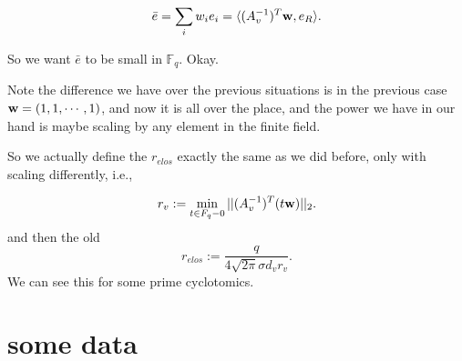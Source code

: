 \documentclass{amsart}
\begin{document}
\[
    \bar{e} = \sum_i w_ie_i =  \langle (A_v^{-1})^T{\bf w}, e_R \rangle.
\]

So we want $\bar{e}$ to be small in $\mathbb{F}_q$. Okay.

Note the difference we have over the previous situations is
in the previous case ${\bf w} = (1,1, \cdots, 1)$, and now it is all over the place, and the power we have in our hand is maybe scaling by any element in the finite field.

So we actually define the $r_{elos}$ exactly the same as we did before, only with scaling differently, i.e.,

\[
    r_v := \min_{t \in F_q - 0} ||(A_v^{-1})^T(t{\bf w})||_2.
\]
and then the old
\[
    r_{elos} := \frac{q}{4\sqrt{2\pi} \sigma d_v r_v}.
\]
We can see this for some prime cyclotomics.

\section{some data}
\end{document}
